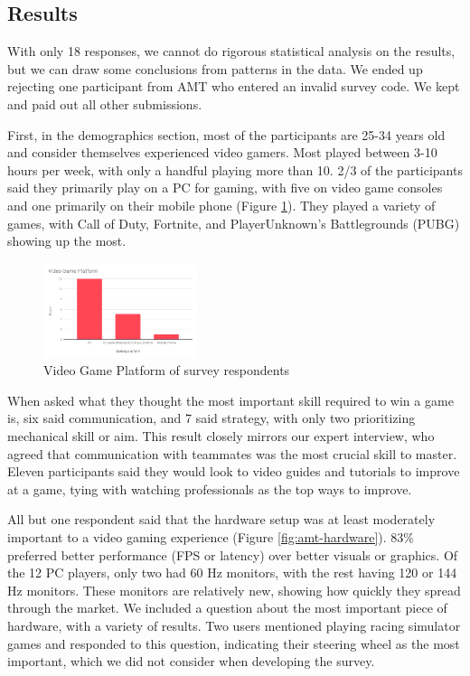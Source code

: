 \documentclass[11pt,manuscript,screen,review]{acmart} %
\begin{document}
\subsection{Results}

With only 18 responses, we cannot do rigorous statistical analysis on the results, but we can draw some conclusions from patterns in the data. We ended up rejecting one participant from AMT who entered an invalid survey code. We kept and paid out all other submissions.

First, in the demographics section, most of the participants are 25-34 years old and consider themselves experienced video gamers. Most played between 3-10 hours per week, with only a handful playing more than 10. 2/3 of the participants said they primarily play on a PC for gaming, with five on video game consoles and one primarily on their mobile phone (Figure \ref{fig:amt-platform}). They played a variety of games, with Call of Duty, Fortnite, and PlayerUnknown's Battlegrounds (PUBG) showing up the most.

\begin{figure}[h]
    \centering
    \includegraphics[width=0.4\textwidth]{img/amt-platform.png}
    \caption{Video Game Platform of survey respondents}
    \label{fig:amt-platform}
\end{figure}

When asked what they thought the most important skill required to win a game is, six said communication, and 7 said strategy, with only two prioritizing mechanical skill or aim. This result closely mirrors our expert interview, who agreed that communication with teammates was the most crucial skill to master. Eleven participants said they would look to video guides and tutorials to improve at a game, tying with watching professionals as the top ways to improve. 

All but one respondent said that the hardware setup was at least moderately important to a video gaming experience (Figure \ref{fig:amt-hardware}). 83\% preferred better performance (FPS or latency) over better visuals or graphics. Of the 12 PC players, only two had 60 Hz monitors, with the rest having 120 or 144 Hz monitors. These monitors are relatively new, showing how quickly they spread through the market. We included a question about the most important piece of hardware, with a variety of results. Two users mentioned playing racing simulator games and responded to this question, indicating their steering wheel as the most important, which we did not consider when developing the survey.
\end{document}
